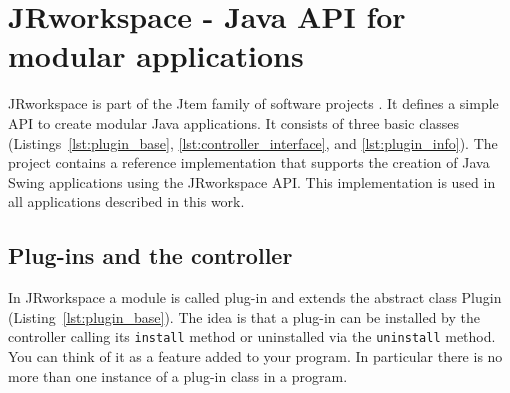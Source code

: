 \section{{\sc JRworkspace} - Java API for modular applications}
\label{sec:jrworkspace}


{\sc JRworkspace} is part of the {\sc Jtem} family of software projects 
\cite{JtemWebsite}. It defines a simple API to create modular Java applications. It consists of
three basic classes (Listings~\ref{lst:plugin_base}, \ref{lst:controller_interface}, and 
\ref{lst:plugin_info}).
The project contains a reference implementation that supports the creation of Java
Swing applications using the {\sc JRworkspace} API. This implementation is used in all 
applications described in this work.

\subsection{Plug-ins and the controller}

In {\sc JRworkspace} a module is called plug-in and extends the abstract class Plugin
(Listing~\ref{lst:plugin_base}). The idea is that a plug-in can be installed by the controller 
calling its {\tt install} method or uninstalled via the {\tt uninstall} method. You can think of it 
as a feature added to your program. In particular there is no more than one instance of a
plug-in class in a program.

